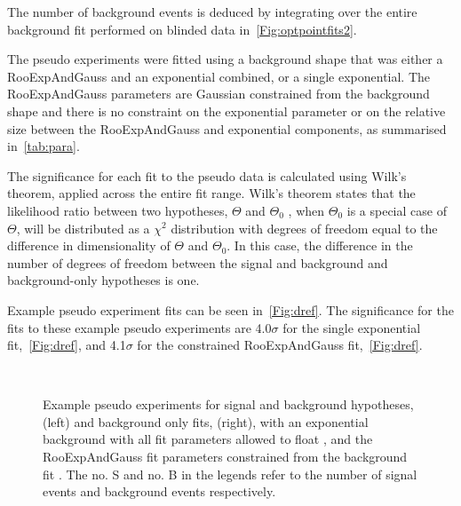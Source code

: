 The number of background events is deduced by integrating over the entire background fit performed on blinded \Lbpi data in~\autoref{Fig:optpointfits2}\protect{}.


The pseudo experiments were fitted using a background shape that was either a RooExpAndGauss and an exponential combined, or a single exponential. The RooExpAndGauss parameters are Gaussian constrained from the \LbK background shape and there is no constraint on the exponential parameter or on the relative size between the RooExpAndGauss and exponential components, as summarised in~\autoref{tab:para}. %
     

The significance for each fit to the pseudo  data is calculated using Wilk's theorem, applied across the entire fit range. Wilk's theorem states that the likelihood ratio between two hypotheses, $\Theta$ and $\Theta_{0}$ , when $\Theta_{0}$ is a special case of $\Theta$, will be distributed as a $\chi^{2}$ distribution with degrees of freedom equal to the difference in dimensionality of $\Theta$ and $\Theta_{0}$. In this case, the difference in the number of degrees of freedom between the signal and background and background-only hypotheses is one.  

Example pseudo experiment fits can be seen in~\autoref{Fig:dref}. The significance for the fits to these example pseudo experiments are 4.0$\sigma$ for the single exponential fit,~\autoref{Fig:dref}\protect{}, and 4.1$\sigma$ for the constrained RooExpAndGauss fit,~\autoref{Fig:dref}\protect{}.


\begin{figure}[h!]
  \def\nh{0.7\textwidth}
  \centering
   \\
  \textwidth
  
  \caption{Example pseudo experiments for signal and background hypotheses, (left) and background only fits, (right), with an exponential background with all fit parameters allowed to float  \protect{}, and the RooExpAndGauss fit parameters constrained from the \LbK background fit \protect{}. The no. S and no. B in the legends refer to the number of signal events and background events respectively.}
\label{Fig:dref}
\end{figure}

